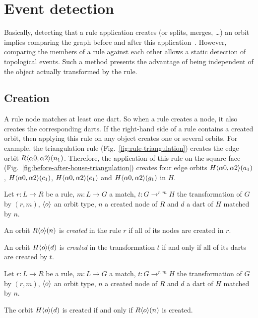 \section{Event detection}\label{sec:event-detection}

Basically, detecting that a rule application creates (or splits, merges, …) an orbit implies comparing the graph before and after this application~\cite{tierney2017using}.
%
However, comparing the members of a rule against each other allows a static detection of topological events.
Such a method presents the advantage of being independent of the object actually transformed by the rule.

\subsection{Creation}

\label{sec:creation}

A rule node matches at least one dart.
So when a rule creates a node, it also creates the corresponding darts.
If the right-hand side of a rule contains a created orbit, then applying this rule on any object creates one or several orbits.
For example, the triangulation rule (Fig.~\ref{fig:rule-triangulation}) creates the edge orbit $R\langle\alpha 0, \alpha 2\rangle(n_{1})$.
Therefore, the application of this rule on the square face (Fig.~\ref{fig:before-after-house-triangulation}) creates four edge orbits $H\langle\alpha 0, \alpha 2\rangle(a_{1})$, $H\langle\alpha 0, \alpha 2\rangle(c_{1})$, $H\langle\alpha 0, \alpha 2\rangle(e_{1})$ and $H\langle\alpha 0, \alpha 2\rangle(g_{1})$ in $H$.
\begin{definition}
  \label{def:orbit-creation}
  Let $r : L \longrightarrow R$ be a rule, $m : L \to G$ a match, $t: G \longrightarrow^{r,m} H$ the transformation of $G$ by $(r,m)$, $\langle o\rangle$ an orbit type, $n$ a created node of $R$ and $d$ a dart of $H$ matched by $n$.

  An orbit $R\langle o\rangle(n)$ is \emph{created} in the rule $r$ if all of its nodes are created in $r$.

  An orbit $H\langle o\rangle(d)$ is \emph{created} in the transformation $t$ if and only if all of its darts are created by $t$.
\end{definition}

\begin{proposition}
Let $r : L \longrightarrow R$ be a rule, $m : L \to G$ a match, $t: G \longrightarrow^{r,m} H$ the transformation of $G$ by $(r,m)$, $\langle o\rangle$ an orbit type, $n$ a created node of $R$ and $d$ a dart of $H$ matched by $n$.

The orbit $H\langle o\rangle(d)$ is created if and only if $R\langle o\rangle(n)$ is created.
\end{proposition}

